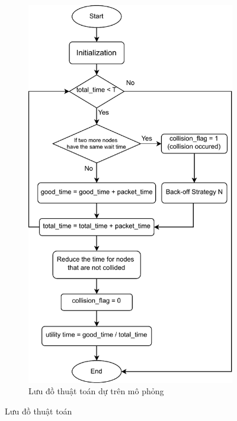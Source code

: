 \begin{figure}[h]
\begin{subfigure}[h]{0.45\linewidth}
        \centering
        \includegraphics[width=1.1\linewidth]{figures/Chapter2/code_flow.pdf}
        \caption{Lưu đồ thuật toán dự trên mô phỏng}
        \label{fig:flowcode}
    \end{subfigure}

    \caption{Lưu đồ thuật toán }
    \label{fig:csmacaflowchart}
\end{figure}


